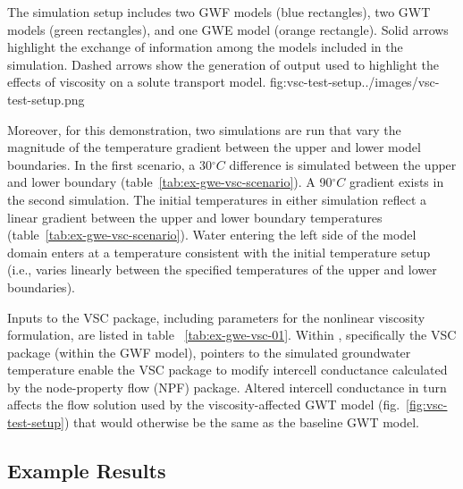 \begin{StandardFigure}{
    The \mf simulation setup includes two GWF models (blue rectangles), two GWT models (green rectangles), and one GWE model (orange rectangle). Solid arrows highlight the exchange of information among the models included in the simulation.  Dashed arrows show the generation of output used to highlight the effects of viscosity on a solute transport model.}
    {fig:vsc-test-setup}{../images/vsc-test-setup.png}
\end{StandardFigure}

Moreover, for this demonstration, two \mf simulations are run that vary the magnitude of the temperature gradient between the upper and lower model boundaries.  In the first scenario, a 30$^{\circ}C$ difference is simulated between the upper and lower boundary (table~\ref{tab:ex-gwe-vsc-scenario}).  A 90$^{\circ}C$ gradient exists in the second \mf simulation.  The initial temperatures in either simulation reflect a linear gradient between the upper and lower boundary temperatures (table~\ref{tab:ex-gwe-vsc-scenario}).  Water entering the left side of the model domain enters at a temperature consistent with the initial temperature setup (i.e., varies linearly between the specified temperatures of the upper and lower boundaries).



Inputs to the VSC package, including parameters for the nonlinear viscosity formulation, are listed in table ~\ref{tab:ex-gwe-vsc-01}.  Within \mf, specifically the VSC package (within the GWF model), pointers to the simulated groundwater temperature enable the VSC package to modify intercell conductance calculated by the node-property flow (NPF) package.  Altered intercell conductance in turn affects the flow solution used by the viscosity-affected GWT model (fig.~\ref{fig:vsc-test-setup}) that would otherwise be the same as the baseline GWT model. 




\subsection{Example Results}

